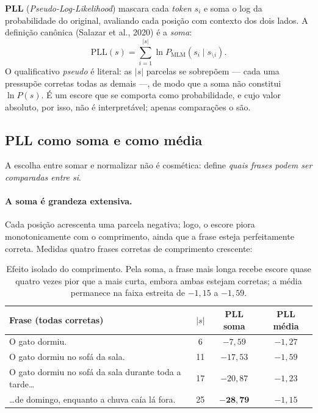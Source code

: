 \documentclass[11pt,a4paper]{article}
\newcommand{\dimtable}[1]{\small #1}
\begin{document}
\textbf{PLL} (\textit{Pseudo-Log-Likelihood}) mascara cada \textit{token} $s_i$ e soma o log da
probabilidade do original, avaliando cada posição com contexto dos dois lados. A definição canônica
(Salazar et al., 2020) é a \emph{soma}:
\begin{equation}
\mathrm{PLL}(s) = \sum_{i=1}^{|s|} \ln P_{\mathrm{MLM}}(s_i \mid s_{\setminus i}).
\label{eq:pll}
\end{equation}
O qualificativo \emph{pseudo} é literal: as $|s|$ parcelas se sobrepõem --- cada uma pressupõe
corretas todas as demais ---, de modo que a soma não constitui $\ln P(s)$. É um escore que se
comporta como probabilidade, e cujo valor absoluto, por isso, não é interpretável; apenas
comparações o são.

\subsection{PLL como soma e como média}
\label{sec:pllsomamedia}

A escolha entre somar e normalizar não é cosmética: define \emph{quais frases podem ser comparadas
entre si}.

\paragraph{A soma é grandeza extensiva.} Cada posição acrescenta uma parcela negativa; logo, o
escore piora monotonicamente com o comprimento, ainda que a frase esteja perfeitamente correta.
Medidas quatro frases corretas de comprimento crescente:

\begin{table}[H]
\centering
\dimtable{
\begin{tabular}{@{}lccc@{}}
\toprule
\textbf{Frase (todas corretas)} & \textbf{$|s|$} & \textbf{PLL soma} & \textbf{PLL média} \\
\midrule
O gato dormiu.                                       & 6  & $-7{,}59$  & $-1{,}27$ \\
O gato dormiu no sofá da sala.                       & 11 & $-17{,}53$ & $-1{,}59$ \\
O gato dormiu no sofá da sala durante toda a tarde\dots & 17 & $-20{,}87$ & $-1{,}23$ \\
\dots de domingo, enquanto a chuva caía lá fora.     & 25 & $\mathbf{-28{,}79}$ & $-1{,}15$ \\
\bottomrule
\end{tabular}}
\caption{Efeito isolado do comprimento. Pela soma, a frase mais longa recebe escore quase quatro
vezes pior que a mais curta, embora ambas estejam corretas; a média permanece na faixa estreita de
$-1{,}15$ a $-1{,}59$.}
\label{tab:pllsoma}
\end{table}
\end{document}
